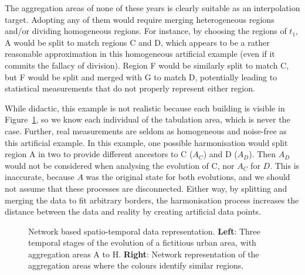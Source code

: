 The aggregation areas of none of these years is clearly suitable as an
interpolation target. Adopting any of them would require merging heterogeneous
regions and/or dividing homogeneous regions. For instance, by choosing the
regions of $t_1$, A would be split to match regions C and D, which appears to be
a rather reasonable approximation in this homogeneous artificial example (even
if it commits the fallacy of division). Region F would be similarly split to
match C, but F would be split and merged with G to match D, potentially leading
to statistical measurements that do not properly represent either region. 

While didactic, this example is not realistic because each building is visible
in Figure~\ref{fig:intuition}, so we know each individual of the tabulation
area, which is never the case. Further, real measurements are seldom as
homogeneous and noise-free as this artificial example.  In this example, one
possible harmonisation would split region A  in two to provide different
ancestors to C ($A_C$) and D ($A_D$). Then $A_D$ would not be considered when
analysing the evolution of C, nor $A_C$ for $D$. This is inaccurate, because $A$
was the original state for both evolutions, and we should not assume that these
processes are disconnected. Either way, by splitting and merging the data to
fit arbitrary borders, the harmonisation process increases the distance between
the data and reality by creating artificial data points.


\begin{figure}
    \centering 
     \caption{Network based spatio-temporal data representation. \textbf{Left}:
    Three temporal stages of the evolution of a fictitious urban area, with
    aggregation areas A to H. \textbf{Right}: Network representation of the
    aggregation areas where the colours identify similar regions.
        \label{fig:intuition}}
\end{figure}

